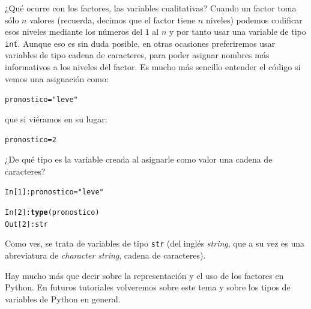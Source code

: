 \documentclass[10pt,a4paper]{article}\usepackage[]{graphicx}\usepackage[]{color}
\makeatletter
\newcommand{\hlnum}[1]{\textcolor[rgb]{0.686,0.059,0.569}{#1}}%
\newcommand{\hlstr}[1]{\textcolor[rgb]{0.192,0.494,0.8}{#1}}%
\newcommand{\hlopt}[1]{\textcolor[rgb]{0,0,0}{#1}}%
\newcommand{\hlstd}[1]{\textcolor[rgb]{0.345,0.345,0.345}{#1}}%
\newcommand{\hlkwb}[1]{\textcolor[rgb]{0.69,0.353,0.396}{#1}}%
\newcommand{\hlkwd}[1]{\textcolor[rgb]{0.737,0.353,0.396}{\textbf{#1}}}%
\newenvironment{kframe}{%
 \def\at@end@of@kframe{}%
 \ifinner\ifhmode%
  \def\at@end@of@kframe{\end{minipage}}%
  \begin{minipage}{\columnwidth}%
 \fi\fi%
 \def\FrameCommand##1{\hskip\@totalleftmargin \hskip-\fboxsep
 \colorbox{shadecolor}{##1}\hskip-\fboxsep
     \hskip-\linewidth \hskip-\@totalleftmargin \hskip\columnwidth}%
 \MakeFramed {\advance\hsize-\width
   \@totalleftmargin\z@ \linewidth\hsize
   \@setminipage}}%
 {\par\unskip\endMakeFramed%
 \at@end@of@kframe}
\newenvironment{knitrout}{}{} %
\makeatother
\begin{document}
¿Qué ocurre con los factores, las variables cualitativas? Cuando un factor toma sólo $n$ valores (recuerda, decimos que el factor tiene $n$ niveles) podemos codificar esos niveles mediante los números del $1$ al $n$ y por tanto usar una variable de tipo {\tt int}. Aunque eso es sin duda posible, en otras ocasiones preferiremos usar variables de tipo cadena de caracteres, para poder asignar nombres más informativos a los niveles del factor. Es mucho más sencillo entender el código si vemos una asignación como:
\begin{knitrout}
\color{fgcolor}\begin{kframe}
\begin{alltt}
\hlstd{pronostico} \hlkwb{=} \hlstr{"leve"}
\end{alltt}
\end{kframe}
\end{knitrout}
que si viéramos en su lugar:
\begin{knitrout}
\color{fgcolor}\begin{kframe}
\begin{alltt}
\hlstd{pronostico} \hlkwb{=} \hlnum{2}
\end{alltt}
\end{kframe}
\end{knitrout}
¿De qué tipo es la variable creada al asignarle como valor una cadena de caracteres?
\begin{knitrout}
\color{fgcolor}\begin{kframe}
\begin{alltt}
\hlstd{In [}\hlnum{1}\hlstd{]}\hlopt{:} \hlstd{pronostico} \hlkwb{=} \hlstr{"leve"}

\hlstd{In [}\hlnum{2}\hlstd{]}\hlopt{:} \hlkwd{type}\hlstd{(pronostico)}
\hlstd{Out[}\hlnum{2}\hlstd{]}\hlopt{:} \hlstd{str}
\end{alltt}
\end{kframe}
\end{knitrout}
Como ves, se trata de variables de tipo {\tt str} (del inglés {\em string}, que a su vez es una abreviatura de {\em character string}, cadena de caracteres).

Hay mucho más que decir sobre la representación y el uso de los factores en Python. En futuros tutoriales volveremos sobre este tema y sobre los tipos de variables de Python en general.
\end{document}
